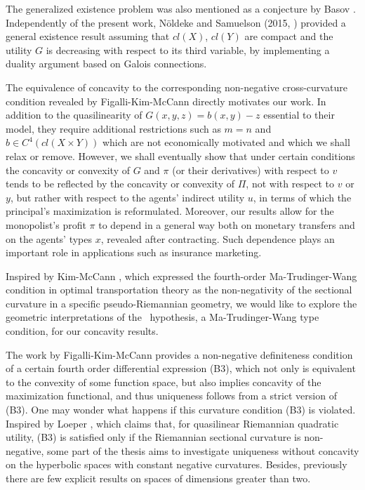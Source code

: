 	The generalized existence problem was also mentioned as a conjecture by Basov \cite[Chapter 8]{Basov05}. 
	Independently of the present work, N\"oldeke and Samuelson (2015, \cite{NoldekeSamuelson15p}) provided a general existence result assuming that $cl(X)$, $cl(Y)$ are compact and the utility $G$ is decreasing with respect to its third variable, by implementing a duality argument based on Galois connections. \medskip



	The equivalence of concavity to the corresponding non-negative cross-curvature condition revealed by Figalli-Kim-McCann \cite{FigalliKimMcCann11} directly motivates our work. In addition to the quasilinearity of
	$G(x,y,z) = b(x,y) - z$ essential to their model,  they require additional restrictions such as $m=n$ and $b \in C^4(cl(X\times Y))$ which are not economically motivated
	and which we shall relax or remove. However,  we shall eventually show that under certain conditions the concavity or convexity of $G$ and $\pi$ (or their derivatives)
	with respect to $v$ tends to be reflected by the concavity or convexity of $\Pi$, not with respect to 
	$v$ or $y$,  but rather with respect to the agents' indirect utility $u$, in terms of 
	which the principal's maximization is reformulated. Moreover, our results allow for the monopolist's profit $\pi$ to depend in a general
	way both on monetary transfers and on the agents' types $x$,  revealed after contracting.  Such dependence plays an important role in applications such as insurance marketing.\medskip
	
	Inspired by Kim-McCann \cite{KimMcCann10}, which expressed the fourth-order Ma-Trudinger-Wang condition in optimal transportation theory as the non-negativity of the sectional curvature in a specific pseudo-Riemannian geometry,
	we would like to explore the geometric interpretations of the \Gthree~hypothesis, a Ma-Trudinger-Wang type condition, for our concavity results.\medskip


The work \cite{FigalliKimMcCann11}  by Figalli-Kim-McCann provides a non-negative definiteness condition of a certain fourth order differential expression (B3), which not only is equivalent to the convexity of some function space,  but also implies concavity of the maximization functional, and thus uniqueness follows from a strict version of (B3). One may wonder what happens if this curvature condition (B3) is violated. Inspired by Loeper \cite{Loeper09}, which claims that, for quasilinear Riemannian quadratic utility, (B3) is satisfied only if the Riemannian sectional curvature is non-negative, some part of the thesis aims to investigate uniqueness  
without concavity on the hyperbolic spaces with constant negative curvatures. Besides, previously there are few explicit results on spaces of dimensions greater than two.\medskip

